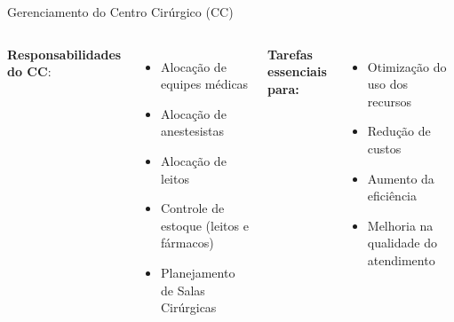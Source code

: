 \documentclass[10pt]{beamer}
\newcommand{\ca}[1]{\textcolor{cr}{#1}}
\begin{document}
\begin{frame}{Gerenciamento do Centro Cirúrgico (CC)}
    \begin{columns}[t]
        \textbf{Responsabilidades do CC}:
        \begin{itemize}
            \setlength\itemsep{1em}
            \item Alocação de equipes médicas
            \item Alocação de anestesistas
            \item Alocação de leitos
            \item Controle de estoque (leitos e fármacos)
            \item \ca{Planejamento de Salas Cirúrgicas}
        \end{itemize}
        \textbf{Tarefas essenciais para:}
        \begin{itemize}
            \setlength\itemsep{1em}
            \item Otimização do uso dos recursos
            \item Redução de custos
            \item Aumento da eficiência
            \item Melhoria na qualidade do atendimento
        \end{itemize}
    \end{columns}
\end{frame}
\end{document}
